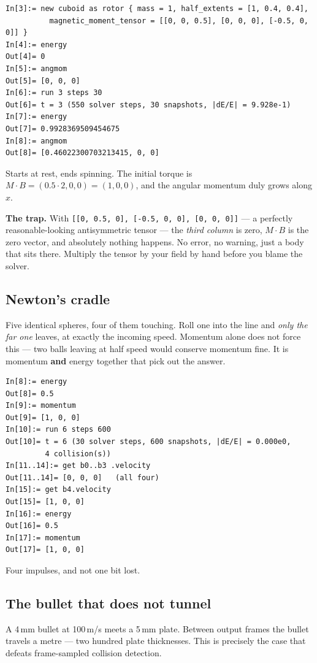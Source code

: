 \documentclass[11pt]{article}
\newcommand{\code}[1]{\texttt{#1}}
\begin{document}
\begin{lstlisting}
In[3]:= new cuboid as rotor { mass = 1, half_extents = [1, 0.4, 0.4],
          magnetic_moment_tensor = [[0, 0, 0.5], [0, 0, 0], [-0.5, 0, 0]] }
In[4]:= energy
Out[4]= 0
In[5]:= angmom
Out[5]= [0, 0, 0]
In[6]:= run 3 steps 30
Out[6]= t = 3 (550 solver steps, 30 snapshots, |dE/E| = 9.928e-1)
In[7]:= energy
Out[7]= 0.9928369509454675
In[8]:= angmom
Out[8]= [0.46022300703213415, 0, 0]
\end{lstlisting}

Starts at rest, ends spinning. The initial torque is
$M\!\cdot\!B = (0.5\cdot2, 0, 0) = (1,0,0)$, and the angular momentum
duly grows along $x$.

\textbf{The trap.} With
\code{[[0, 0.5, 0], [-0.5, 0, 0], [0, 0, 0]]} --- a perfectly
reasonable-looking antisymmetric tensor --- the \emph{third column} is
zero, $M\!\cdot\!B$ is the zero vector, and absolutely nothing happens.
No error, no warning, just a body that sits there. Multiply the tensor
by your field by hand before you blame the solver.

\subsection{Newton's cradle}

Five identical spheres, four of them touching. Roll one into the line
and \emph{only the far one} leaves, at exactly the incoming speed.
Momentum alone does not force this --- two balls leaving at half speed
would conserve momentum fine. It is momentum \textbf{and} energy
together that pick out the answer.

\begin{lstlisting}
In[8]:= energy
Out[8]= 0.5
In[9]:= momentum
Out[9]= [1, 0, 0]
In[10]:= run 6 steps 600
Out[10]= t = 6 (30 solver steps, 600 snapshots, |dE/E| = 0.000e0,
         4 collision(s))
In[11..14]:= get b0..b3 .velocity
Out[11..14]= [0, 0, 0]   (all four)
In[15]:= get b4.velocity
Out[15]= [1, 0, 0]
In[16]:= energy
Out[16]= 0.5
In[17]:= momentum
Out[17]= [1, 0, 0]
\end{lstlisting}

Four impulses, and not one bit lost.

\subsection{The bullet that does not tunnel}

A 4\,mm bullet at 100\,m/s meets a 5\,mm plate. Between output frames
the bullet travels a metre --- two hundred plate thicknesses. This is
precisely the case that defeats frame-sampled collision detection.
\end{document}
